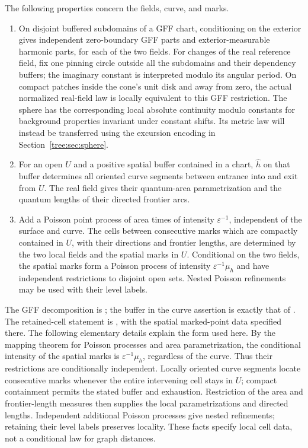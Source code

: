 \begin{proposition}
\label{tree:prop:background_locality}
The following properties concern the fields, curve, and marks.
\begin{enumerate}
\item On disjoint buffered subdomains of a GFF chart, conditioning
on the exterior gives independent zero-boundary GFF parts and
exterior-measurable harmonic parts, for each of the two fields.
For changes of the real reference field, fix one pinning circle
outside all the subdomains and their dependency buffers; the
imaginary constant is interpreted modulo its angular period.
On compact patches inside the cone's unit disk and away from zero,
the actual normalized real-field law is locally equivalent to this
GFF restriction. The sphere has the corresponding local absolute
continuity modulo constants for background properties invariant under
constant shifts. Its metric law will instead be transferred using
the excursion encoding in Section~\ref{tree:sec:sphere}.
\item For an open $U$ and a positive spatial buffer contained
in a chart, $\widehat h$ on that buffer determines all oriented
curve segments between entrance into and exit from $U$.
The real field gives their quantum-area parametrization and
the quantum lengths of their directed frontier arcs.
\item Add a Poisson point process of area times of intensity
$\varepsilon^{-1}$, independent of the surface and curve.
The cells between consecutive marks which are compactly
contained in $U$, with their directions and frontier lengths,
are determined by the two local fields and the spatial marks
in $U$. Conditional on the two fields, the spatial marks form
a Poisson process of intensity $\varepsilon^{-1}\mu_h$ and
have independent restrictions to disjoint open sets. Nested
Poisson refinements may be used with their level labels.
\end{enumerate}
\end{proposition}

The GFF decomposition is \cite[Lemmas~2.1--2.2]{GwynneMillerSheffieldHarmonic};
the buffer in the curve assertion is exactly that of
\cite[Lemma~2.4]{GwynneMillerSheffieldHarmonic}. The retained-cell statement is
\cite[Lemma~3.7]{ContrerasHipGwynneCurvature}, with the spatial marked-point
data specified there. The following elementary details explain
the form used here. By the mapping theorem for Poisson
processes and area parametrization, the conditional intensity
of the spatial marks is $\varepsilon^{-1}\mu_h$, regardless of
the curve. Thus their restrictions are conditionally
independent. Locally oriented curve segments locate consecutive
marks whenever the entire intervening cell stays in $U$;
compact containment permits the stated buffer and exhaustion.
Restriction of the area and frontier-length measures then
supplies the local parametrizations and directed lengths.
Independent additional Poisson processes give nested
refinements; retaining their level labels preserves locality.
These facts specify local cell data, not a conditional law for
graph distances.

